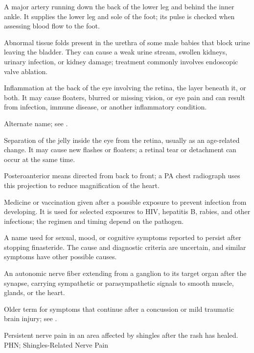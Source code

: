  A major artery running down the back of the lower leg and behind the inner ankle. It supplies the lower leg and sole of the foot; its pulse is checked when assessing blood flow to the foot.

 Abnormal tissue folds present in the urethra of some male babies that block urine leaving the bladder. They can cause a weak urine stream, swollen kidneys, urinary infection, or kidney damage; treatment commonly involves endoscopic valve ablation.

 Inflammation at the back of the eye involving the retina, the layer beneath it, or both. It may cause floaters, blurred or missing vision, or eye pain and can result from infection, immune disease, or another inflammatory condition.

 Alternate name; see .

 Separation of the jelly inside the eye from the retina, usually as an age-related change. It may cause new flashes or floaters; a retinal tear or detachment can occur at the same time.

 Posteroanterior means directed from back to front; a PA chest radiograph uses this projection to reduce magnification of the heart.

 Medicine or vaccination given after a possible exposure to prevent infection from developing. It is used for selected exposures to HIV, hepatitis B, rabies, and other infections; the regimen and timing depend on the pathogen.

 A name used for sexual, mood, or cognitive symptoms reported to persist after stopping finasteride. The cause and diagnostic criteria are uncertain, and similar symptoms have other possible causes.

 An autonomic nerve fiber extending from a ganglion to its target organ after the synapse, carrying sympathetic or parasympathetic signals to smooth muscle, glands, or the heart.

 Older term for symptoms that continue after a concussion or mild traumatic brain injury; see .

 Persistent nerve pain in an area affected by shingles after the rash has healed.
\synonyms
PHN; Shingles-Related Nerve Pain

